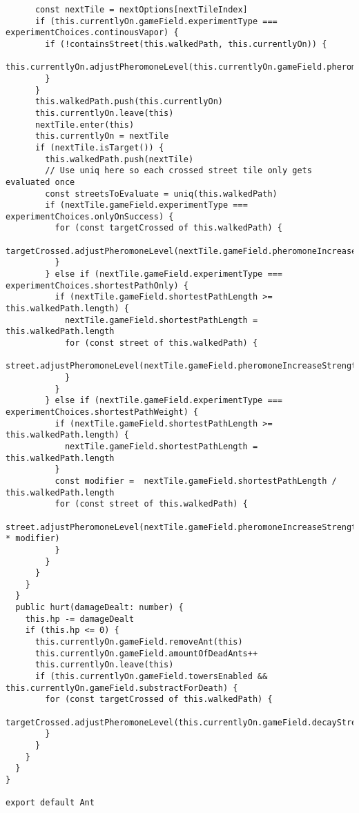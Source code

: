 \begin{lstlisting}
      const nextTile = nextOptions[nextTileIndex]
      if (this.currentlyOn.gameField.experimentType === experimentChoices.continousVapor) {
        if (!containsStreet(this.walkedPath, this.currentlyOn)) {
          this.currentlyOn.adjustPheromoneLevel(this.currentlyOn.gameField.pheromoneIncreaseStrength)
        }
      }
      this.walkedPath.push(this.currentlyOn)
      this.currentlyOn.leave(this)
      nextTile.enter(this)
      this.currentlyOn = nextTile
      if (nextTile.isTarget()) {
        this.walkedPath.push(nextTile)
        // Use uniq here so each crossed street tile only gets evaluated once
        const streetsToEvaluate = uniq(this.walkedPath)
        if (nextTile.gameField.experimentType === experimentChoices.onlyOnSuccess) {
          for (const targetCrossed of this.walkedPath) {
            targetCrossed.adjustPheromoneLevel(nextTile.gameField.pheromoneIncreaseStrength)
          }
        } else if (nextTile.gameField.experimentType === experimentChoices.shortestPathOnly) {
          if (nextTile.gameField.shortestPathLength >= this.walkedPath.length) {
            nextTile.gameField.shortestPathLength = this.walkedPath.length
            for (const street of this.walkedPath) {
              street.adjustPheromoneLevel(nextTile.gameField.pheromoneIncreaseStrength)
            }
          }
        } else if (nextTile.gameField.experimentType === experimentChoices.shortestPathWeight) {
          if (nextTile.gameField.shortestPathLength >= this.walkedPath.length) {
            nextTile.gameField.shortestPathLength = this.walkedPath.length
          }
          const modifier =  nextTile.gameField.shortestPathLength / this.walkedPath.length
          for (const street of this.walkedPath) {
            street.adjustPheromoneLevel(nextTile.gameField.pheromoneIncreaseStrength * modifier)
          }
        }
      }
    }
  }
  public hurt(damageDealt: number) {
    this.hp -= damageDealt
    if (this.hp <= 0) {
      this.currentlyOn.gameField.removeAnt(this)
      this.currentlyOn.gameField.amountOfDeadAnts++
      this.currentlyOn.leave(this)
      if (this.currentlyOn.gameField.towersEnabled && this.currentlyOn.gameField.substractForDeath) {
        for (const targetCrossed of this.walkedPath) {
          targetCrossed.adjustPheromoneLevel(this.currentlyOn.gameField.decayStrength)
        }
      }
    }
  }
}

export default Ant

\end{lstlisting}

